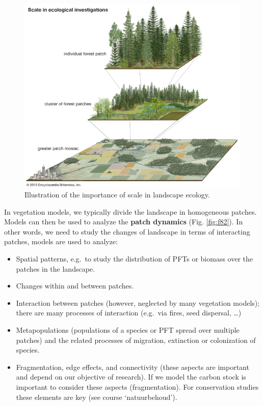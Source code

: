 \documentclass[12pt,oneside]{book}
\providecommand{\tightlist}{%
  \setlength{\itemsep}{0pt}\setlength{\parskip}{0pt}}
\begin{document}
\begin{figure}

{\centering \includegraphics[width=0.8\linewidth]{figures/chap8/f81_landscape} 

}

\caption{Illustration of the importance of scale in landscape ecology.}\label{fig:f81}
\end{figure}

In vegetation models, we typically divide the landscape in homogeneous
patches. Models can then be used to analyze the \textbf{patch dynamics}
(Fig. \ref{fig:f82}). In other words, we need to study the changes of
landscape in terms of interacting patches, models are used to analyze:

\begin{itemize}
\tightlist
\item
  Spatial patterns, e.g.~to study the distribution of PFTs or biomass
  over the patches in the landscape.
\item
  Changes within and between patches.
\item
  Interaction between patches (however, neglected by many vegetation
  models); there are many processes of interaction (e.g.~via fires, seed
  dispersal, \ldots{})
\item
  Metapopulations (populations of a species or PFT spread over multiple
  patches) and the related processes of migration, extinction or
  colonization of species.
\item
  Fragmentation, edge effects, and connectivity (these aspects are
  important and depend on our objective of research). If we model the
  carbon stock is important to consider these aspects (fragmentation).
  For conservation studies these elements are key (see course
  `natuurbehoud').
\end{itemize}
\end{document}
